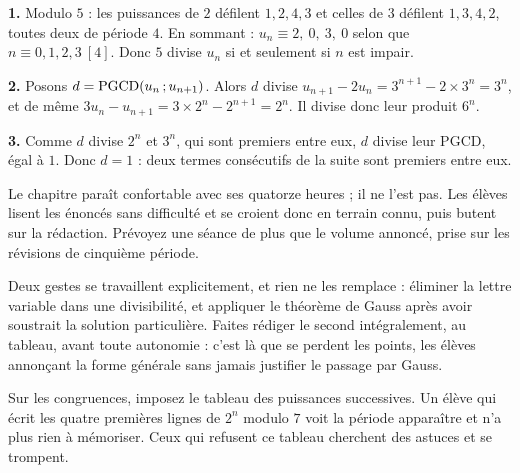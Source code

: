 \begin{corrige}
\textbf{1.} Modulo $5$ : les puissances de $2$ défilent $1,2,4,3$ et celles de
$3$ défilent $1,3,4,2$, toutes deux de période $4$. En sommant :
$u_{n} \equiv 2,\ 0,\ 3,\ 0$ selon que $n \equiv 0,1,2,3 \ [4]$. Donc $5$
divise $u_{n}$ si et seulement si $n$ est impair.

\textbf{2.} Posons $d = \operatorname{PGCD}(u_{n}\,;u_{n+1})$. Alors $d$ divise
$u_{n+1}-2u_{n} = 3^{n+1}-2\times3^{n} = 3^{n}$, et de même
$3u_{n}-u_{n+1} = 3\times2^{n}-2^{n+1} = 2^{n}$. Il divise donc leur produit
$6^{n}$.

\textbf{3.} Comme $d$ divise $2^{n}$ et $3^{n}$, qui sont premiers entre eux,
$d$ divise leur PGCD, égal à $1$. Donc $d = 1$ : deux termes consécutifs de la
suite sont premiers entre eux.
\end{corrige}

\begin{notepourlaclasse}
Le chapitre paraît confortable avec ses quatorze heures ; il ne l'est pas. Les
élèves lisent les énoncés sans difficulté et se croient donc en terrain connu,
puis butent sur la rédaction. Prévoyez une séance de plus que le volume
annoncé, prise sur les révisions de cinquième période.

Deux gestes se travaillent explicitement, et rien ne les remplace : éliminer
la lettre variable dans une divisibilité, et appliquer le théorème de Gauss
après avoir soustrait la solution particulière. Faites rédiger le second
intégralement, au tableau, avant toute autonomie : c'est là que se perdent les
points, les élèves annonçant la forme générale sans jamais justifier le
passage par Gauss.

Sur les congruences, imposez le tableau des puissances successives. Un élève
qui écrit les quatre premières lignes de $2^{n}$ modulo $7$ voit la période
apparaître et n'a plus rien à mémoriser. Ceux qui refusent ce tableau
cherchent des astuces et se trompent.
\end{notepourlaclasse}

